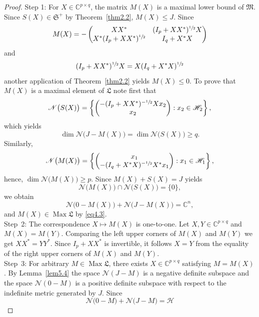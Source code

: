 \documentclass[10pt,a4paper]{amsart}
\DeclareMathOperator{\Max}{Max}
\newcommand{\frakL}{\mathfrak L}
\newcommand{\frakM}{\mathfrak M}
\newcommand{\frakS}{\mathfrak S}
\begin{document}
\begin{proof}
Step 1: For $X\in\mathbb C^{p\times q}$, the matrix $M(X)$ is a
maximal lower bound of $\frakM$. Since $S(X)\in\frakS^{+}$ by
Theorem~\ref{thm2.2}, $M(X)\leq J$. Since
\[
M(X)=
- \begin{pmatrix}
  XX^{\ast} & (I_{p}+XX^{\ast})^{\sfrac{1}{2}}X \\
  X^{\ast}(I_{p}+XX^{\ast})^{\sfrac{1}{2}} & I_{q}+X^{\ast}X
  \end{pmatrix}
\]
and
\[
(I_{p}+XX^{\ast})^{\sfrac{1}{2}}X = X(I_{q}+X^{\ast}X)^{\sfrac{1}{2}}
\]
another application of Theorem~\ref{thm2.2} yields $M(X)\leq0$. To
prove that $M(X)$ is a maximal element of $\frakL$ note first that
\[
  \mathscr N\bigl(S(X)\bigr)=\left\{
    \begin{pmatrix}
    -(I_{p}+XX^{\ast})^{-\sfrac{1}{2}} X x_{2} \\ x_{2}
    \end{pmatrix}
    : x_{2} \in\mathscr H_{2}\right\},
\]  
which yields
\[
\dim\mathscr N\bigl(J-M(X)\bigr) = \dim\mathscr N\bigl(S(X)\bigr)\geq q.
\]
Similarly,
\[
  \mathscr N\bigl(M(X)\bigr)=\left\{
    \begin{pmatrix}
    x_{1} \\
    -(I_{q}+X^{\ast}X)^{-\sfrac{1}{2}} X^{\ast}x_{1} 
    \end{pmatrix}
    : x_{1} \in\mathscr H_{1}\right\},
\]
hence, $\dim\mathscr N\bigl(M(X)\bigr)\geq p$.
Since $M(X)+S(X)=J$ yields
\[
\mathscr N\bigl(M(X)\bigr) \cap \mathscr N\bigl(S(X)\bigr) = \{0\},
\]
we obtain 
\[
\mathscr N\bigl(0-M(X)\bigr) + \mathscr N\bigl(J-M(X)\bigr) = \mathbb C^{n},
\]
and $M(X)\in\Max\frakL$ by \eqref{eq4.3}. \\
Step~2: The correspondence $X\mapsto M(X)$ is one-to-one. Let
$X,Y\in\mathbb C^{p\times q}$ and $M(X)=M(Y)$. Comparing the left
upper  corners of $M(X)$ and $M(Y)$ we get
$XX^{\ast}=YY^{\ast}$. Since $I_{p}+XX^{\ast}$ is invertible, it
follows $X=Y$ from the equality of the right upper corners of $M(X)$
and $M(Y)$. \\
Step~3: For arbitrary $M\in\Max\frakL$, there exists $X\in\mathbb
C^{p\times q}$ satisfying $M=M(X)$. By Lemma~\ref{lem5.4} the space
$\mathscr N(J-M)$ is a negative definite subspace and the space
$\mathscr N(0-M)$ is a positive definite subspace with respect to the
indefinite metric generated by $J$. Since 
\begin{equation}
\label{eq5.4}  
\mathscr N\bigl(0-M\bigr) + \mathscr N\bigl(J-M\bigr) = \mathscr H
\end{equation}

\end{proof}
\end{document}
